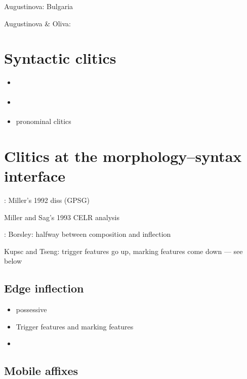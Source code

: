 \documentclass[output=paper
 	        ,biblatex
                ,babelshorthands
                ,newtxmath
                ,draftmode
                ,colorlinks, citecolor=brown
]{langscibook}
\begin{document}
Augustinova: Bulgaria \citet{avgustinova_t97}

Augustinova \& Oliva: 

\section{Syntactic clitics}

\begin{itemize}
\item {} \citep{Penn:99}

\item {} \citep{avgustinova_t-oliva_k95}
\item {} pronominal clitics \citep{kupsc_a00,kupsc_a99}

\end{itemize}

\section{Clitics at the morphology--syntax interface}

: Miller's 1992 diss (GPSG)

Miller and Sag's 1993 CELR analysis 

:
Borsley: halfway between composition and inflection

Kupsc and Tseng: trigger features go up, marking features come down
--- see below

\subsection{Edge inflection}

\begin{itemize}
\item {} possessive \citep{zwicky_a87}

\item Trigger features and marking features
  \citep{miller_p-halpern_a93}

\item {} \citep{Tseng02,Bonami14c}
\end{itemize}

\subsection{Mobile affixes}
\end{document}
